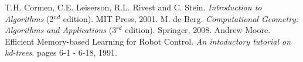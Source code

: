 
\begin{thebibliography}{9}
    T.H. Cormen, C.E. Leiserson, R.L. Rivest and C. Stein. 
    \textit{Introduction to Algorithms} (2$^{nd}$ edition). 
    MIT Press, 2001.
    M. de Berg. 
    \textit{Computational Geometry: Algorithms and Applications} (3$^{rd}$ edition). 
    Springer, 2008.
    Andrew Moore. 
    Efficient Memory-based Learning for Robot Control. 
    \textit{An intoductory tutorial on kd-trees}. 
    pages 6-1 - 6-18, 1991.
\end{thebibliography}
